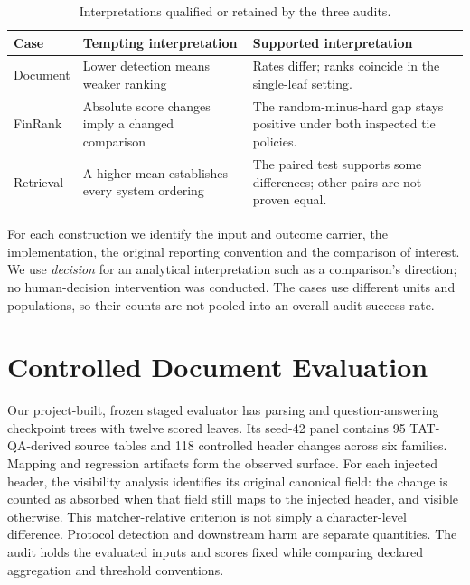 \documentclass[conference]{IEEEtran}
\begin{document}
\begin{table}[htbp]
\caption{Interpretations qualified or retained by the three audits.}
\label{tab:interpretations}
\centering
\footnotesize
\renewcommand{\arraystretch}{1.12}
\begin{tabular}{@{}>{\raggedright\arraybackslash}p{}>{\raggedright\arraybackslash}p{}>{\raggedright\arraybackslash}p{}@{}}
\hline
Case & Tempting interpretation & Supported interpretation \\
\hline
Document & Lower detection means weaker ranking & Rates differ; ranks coincide in the single-leaf setting. \\
FinRank & Absolute score changes imply a changed comparison & The random-minus-hard gap stays positive under both inspected tie policies. \\
Retrieval & A higher mean establishes every system ordering & The paired test supports some differences; other pairs are not proven equal. \\
\hline
\end{tabular}
\end{table}

For each construction we identify the input and outcome carrier, the
implementation, the original reporting convention and the comparison of
interest. We use \emph{decision} for an analytical interpretation such
as a comparison's direction; no human-decision intervention was
conducted. The cases use different units and populations, so their
counts are not pooled into an overall audit-success rate.

\section{Controlled Document
Evaluation}\label{controlled-document-evaluation}

Our project-built, frozen staged evaluator has parsing and
question-answering checkpoint trees with twelve scored leaves. Its
seed-42 panel contains 95 TAT-QA-derived source tables \cite{r9} and 118
controlled header changes across six families. Mapping and regression
artifacts form the observed surface. For each injected header, the
visibility analysis identifies its original canonical field: the change
is counted as absorbed when that field still maps to the injected
header, and visible otherwise. This matcher-relative criterion is not
simply a character-level difference. Protocol detection and downstream
harm are separate quantities. The audit holds the evaluated inputs and
scores fixed while comparing declared aggregation and threshold
conventions.
\end{document}
